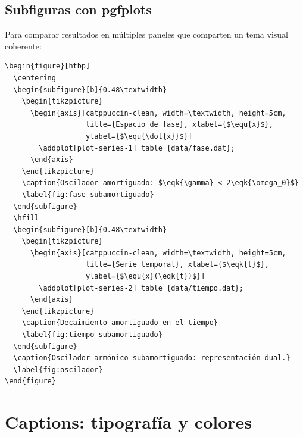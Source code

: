 \subsection{Subfiguras con pgfplots}
\label{subsec:pgfplots-subfig}

Para comparar resultados en múltiples paneles que comparten un tema
visual coherente:

\begin{lstlisting}[style=latex, frame=none, numbers=none]
\begin{figure}[htbp]
  \centering
  \begin{subfigure}[b]{0.48\textwidth}
    \begin{tikzpicture}
      \begin{axis}[catppuccin-clean, width=\textwidth, height=5cm,
                   title={Espacio de fase}, xlabel={$\equ{x}$},
                   ylabel={$\equ{\dot{x}}$}]
        \addplot[plot-series-1] table {data/fase.dat};
      \end{axis}
    \end{tikzpicture}
    \caption{Oscilador amortiguado: $\eqk{\gamma} < 2\eqk{\omega_0}$}
    \label{fig:fase-subamortiguado}
  \end{subfigure}
  \hfill
  \begin{subfigure}[b]{0.48\textwidth}
    \begin{tikzpicture}
      \begin{axis}[catppuccin-clean, width=\textwidth, height=5cm,
                   title={Serie temporal}, xlabel={$\eqk{t}$},
                   ylabel={$\equ{x}(\eqk{t})$}]
        \addplot[plot-series-2] table {data/tiempo.dat};
      \end{axis}
    \end{tikzpicture}
    \caption{Decaimiento amortiguado en el tiempo}
    \label{fig:tiempo-subamortiguado}
  \end{subfigure}
  \caption{Oscilador armónico subamortiguado: representación dual.}
  \label{fig:oscilador}
\end{figure}
\end{lstlisting}

\section{Captions: tipografía y colores}
\label{sec:captions}

